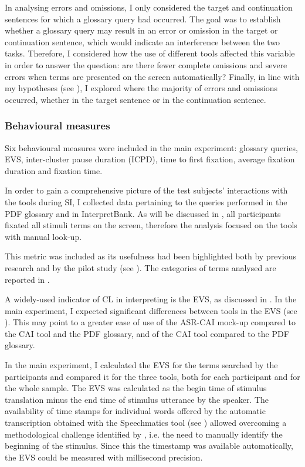 In analysing errors and omissions, I only considered the target and continuation sentences for which a glossary query had occurred. The goal was to establish whether a glossary query may result in an error or omission in the target or continuation sentence, which would indicate an interference between the two tasks. Therefore, I considered how the use of different tools affected this variable in order to answer the question: are there fewer complete omissions and severe errors when terms are presented on the screen automatically? Finally, in line with my hypotheses (see ), I explored where the majority of errors and omissions occurred, whether in the target sentence or in the continuation sentence.


\subsubsection{Behavioural measures} \label{behaviouralm}
\begin{sloppypar}
Six behavioural measures were included in the main experiment: glossary queries, EVS, inter-cluster pause duration (ICPD), time to first fixation, average fixation duration and fixation time.
\end{sloppypar}

In order to gain a comprehensive picture of the test subjects’ interactions with the tools during SI, I collected data pertaining to the queries performed in the PDF glossary and in InterpretBank. As will be discussed in , all participants fixated all stimuli terms on the screen, therefore the analysis focused on the tools with manual look-up.

This metric was included as its usefulness had been highlighted both by previous research \citep{prandi_uso_2015,prandi_use_2015,biagini_glossario_2015} and by the pilot study (see ). The categories of terms analysed are reported in .

A widely-used indicator of CL in interpreting is the EVS, as discussed in . In the main experiment, I expected significant differences between tools in the EVS (see ). This may point to a greater ease of use of the ASR-CAI mock-up compared to the CAI tool and the PDF glossary, and of the CAI tool compared to the PDF glossary.

In the main experiment, I calculated the EVS for the terms searched by the participants and compared it for the three tools, both for each participant and for the whole sample. The EVS was calculated as the begin time of stimulus translation minus the end time of stimulus utterance by the speaker. The availability of time stamps for individual words offered by the automatic transcription obtained with the Speechmatics tool (see ) allowed overcoming a methodological challenge identified by \citet[155]{alvstad_time_2011}, i.e. the need to manually identify the beginning of the stimulus. Since this the timestamp was available automatically, the EVS could be measured with millisecond precision.

